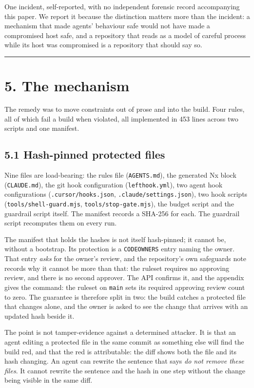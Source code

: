 \documentclass[11pt,a4paper]{article}
\begin{document}
One incident, self-reported, with no independent forensic record accompanying this paper. We report it because the distinction matters more than the incident: a mechanism that made agents' behaviour safe would not have made a compromised host safe, and a repository that reads as a model of careful process while its host was compromised is a repository that should say so.

\medskip\hrule\medskip

\section*{5. The mechanism}

The remedy was to move constraints out of prose and into the build. Four rules, all of which fail a build when violated, all implemented in 453 lines across two scripts and one manifest.

\subsection*{5.1 Hash-pinned protected files}

Nine files are load-bearing: the rules file (\texttt{AGENTS.md}), the generated Nx block (\texttt{CLAUDE.md}), the git hook configuration (\texttt{lefthook.yml}), two agent hook configurations (\texttt{.cursor/hooks.json}, \texttt{.claude/settings.json}), two hook scripts (\texttt{tools/shell-guard.mjs}, \texttt{tools/stop-gate.mjs}), the budget script and the guardrail script itself. The manifest records a SHA-256 for each. The guardrail script recomputes them on every run.

The manifest that holds the hashes is not itself hash-pinned; it cannot be, without a bootstrap. Its protection is a \texttt{CODEOWNERS} entry naming the owner. That entry \emph{asks} for the owner's review, and the repository's own safeguards note records why it cannot be more than that: the ruleset requires no approving review, and there is no second approver. The API confirms it, and the appendix gives the command: the ruleset on \texttt{main} sets its required approving review count to zero. The guarantee is therefore split in two: the build catches a protected file that changes alone, and the owner is asked to see the change that arrives with an updated hash beside it.

The point is not tamper-evidence against a determined attacker. It is that an agent editing a protected file in the same commit as something else will find the build red, and that the red is attributable: the diff shows both the file and its hash changing. An agent can rewrite the sentence that says \emph{do not remove these files}. It cannot rewrite the sentence and the hash in one step without the change being visible in the same diff.
\end{document}

